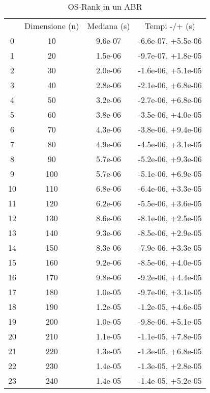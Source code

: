 \begin{table}
\centering
\caption{OS-Rank in un ABR}
\label{OS-Rank in un ABR}
\begin{adjustbox}{width=1\textwidth/2}
\begin{tabular}{|c|c|c|c|}
\hline
 & Dimensione (n) & Mediana (s) & Tempi -/+ (s) \\
0 & 10 & 9.6e-07 & -6.6e-07, +5.5e-06 \\
\cline{1-4}
1 & 20 & 1.5e-06 & -9.7e-07, +1.8e-05 \\
\cline{1-4}
2 & 30 & 2.0e-06 & -1.6e-06, +5.1e-05 \\
\cline{1-4}
3 & 40 & 2.8e-06 & -2.1e-06, +6.8e-06 \\
\cline{1-4}
4 & 50 & 3.2e-06 & -2.7e-06, +6.8e-06 \\
\cline{1-4}
5 & 60 & 3.8e-06 & -3.5e-06, +4.0e-05 \\
\cline{1-4}
6 & 70 & 4.3e-06 & -3.8e-06, +9.4e-06 \\
\cline{1-4}
7 & 80 & 4.9e-06 & -4.5e-06, +3.1e-05 \\
\cline{1-4}
8 & 90 & 5.7e-06 & -5.2e-06, +9.3e-06 \\
\cline{1-4}
9 & 100 & 5.7e-06 & -5.1e-06, +6.9e-05 \\
\cline{1-4}
10 & 110 & 6.8e-06 & -6.4e-06, +3.3e-05 \\
\cline{1-4}
11 & 120 & 6.2e-06 & -5.5e-06, +3.6e-05 \\
\cline{1-4}
12 & 130 & 8.6e-06 & -8.1e-06, +2.5e-05 \\
\cline{1-4}
13 & 140 & 9.3e-06 & -8.5e-06, +2.9e-05 \\
\cline{1-4}
14 & 150 & 8.3e-06 & -7.9e-06, +3.3e-05 \\
\cline{1-4}
15 & 160 & 9.2e-06 & -8.5e-06, +4.0e-05 \\
\cline{1-4}
16 & 170 & 9.8e-06 & -9.2e-06, +4.4e-05 \\
\cline{1-4}
17 & 180 & 1.0e-05 & -9.7e-06, +3.1e-05 \\
\cline{1-4}
18 & 190 & 1.2e-05 & -1.2e-05, +4.6e-05 \\
\cline{1-4}
19 & 200 & 1.0e-05 & -9.8e-06, +5.1e-05 \\
\cline{1-4}
20 & 210 & 1.1e-05 & -1.1e-05, +7.8e-05 \\
\cline{1-4}
21 & 220 & 1.3e-05 & -1.3e-05, +6.8e-05 \\
\cline{1-4}
22 & 230 & 1.4e-05 & -1.3e-05, +2.8e-05 \\
\cline{1-4}
23 & 240 & 1.4e-05 & -1.4e-05, +5.2e-05 \\

\end{tabular}
\end{adjustbox}
\end{table}
